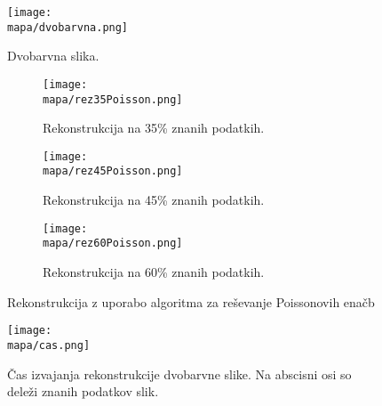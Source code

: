 \renewcommand{\mapa}{Poglavja/Slike/dvobarvna}

\begin{figure}[!ht]
    \centering
    \texttt{[image: \\mapa/dvobarvna.png]}
    \caption{Dvobarvna slika.}
\end{figure}

\begin{figure}[!ht]
    \begin{subfigure}{0.32\linewidth}
        \texttt{[image: \\mapa/rez35Poisson.png]}
        \caption{Rekonstrukcija na 35\% znanih podatkih.}
    \end{subfigure}
    \hfill
    \begin{subfigure}{0.32\linewidth}
        \texttt{[image: \\mapa/rez45Poisson.png]}
        \caption{Rekonstrukcija na 45\% znanih podatkih.}
    \end{subfigure}
    \hfill
    \begin{subfigure}{0.32\linewidth}
        \texttt{[image: \\mapa/rez60Poisson.png]}
        \caption{Rekonstrukcija na 60\% znanih podatkih.}
    \end{subfigure}
    \caption{Rekonstrukcija z uporabo algoritma za reševanje Poissonovih enačb}
\end{figure}
\clearpage

\begin{figure}[H]
    \centering
    \texttt{[image: \\mapa/cas.png]}
    \caption{Čas izvajanja rekonstrukcije dvobarvne slike. Na abscisni osi so deleži znanih podatkov slik.}
\end{figure}